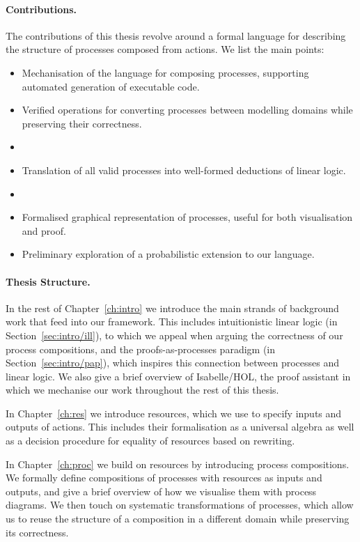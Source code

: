\documentclass[class=smolathesis,crop=false]{standalone}
\begin{document}
\paragraph*{Contributions.}

The contributions of this thesis revolve around a formal language for describing the structure of processes composed from actions.
We list the main points:
\begin{itemize}
  \item Mechanisation of the language for composing processes, supporting automated generation of executable code.
  \item Verified operations for converting processes between modelling domains while preserving their correctness.
  \item {}
  \item Translation of all valid processes into well-formed deductions of linear logic.
  \item {}
  \item Formalised graphical representation of processes, useful for both visualisation and proof.
  \item Preliminary exploration of a probabilistic extension to our language.
\end{itemize}

\paragraph*{Thesis Structure.}
In the rest of Chapter~\ref{ch:intro} we introduce the main strands of background work that feed into our framework.
This includes intuitionistic linear logic (in Section~\ref{sec:intro/ill}), to which we appeal when arguing the correctness of our process compositions, and the proofs-as-processes paradigm (in Section~\ref{sec:intro/pap}), which inspires this connection between processes and linear logic.
We also give a brief overview of  Isabelle/HOL, the proof assistant in which we mechanise our work throughout the rest of this thesis.

In Chapter~\ref{ch:res} we introduce resources, which we use to specify inputs and outputs of actions.
This includes their formalisation as a universal algebra as well as a decision procedure for equality of resources based on rewriting.

In Chapter~\ref{ch:proc} we build on resources by introducing process compositions.
We formally define compositions of processes with resources as inputs and outputs, and give a brief overview of how we visualise them with process diagrams.
We then touch on systematic transformations of processes, which allow us to reuse the structure of a composition in a different domain while preserving its correctness.
\end{document}
